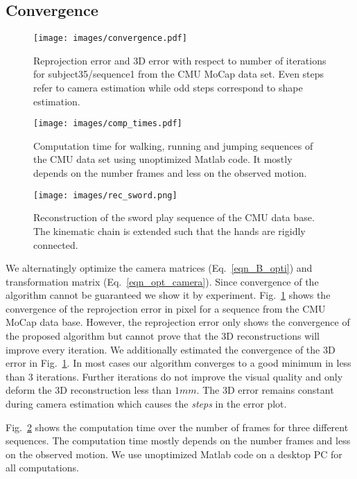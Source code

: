 \documentclass[10pt,letterpaper]{article}
\begin{document}
\subsection{Convergence}
\begin{figure}[t]
	\begin{center}
		\texttt{[image: images/convergence.pdf]}
	\end{center}
	\caption{Reprojection error and 3D error with respect to number of iterations for subject35/sequence1 from the CMU MoCap data set. Even steps refer to camera estimation while odd steps correspond to shape estimation.}
	\label{fig_convergence}
\end{figure}
\begin{figure}[t]
	\begin{center}
		\texttt{[image: images/comp\_times.pdf]}
	\end{center}
	\caption{Computation time for walking, running and jumping sequences of the CMU data set using unoptimized Matlab code. It mostly depends on the number frames and less on the observed motion.}
	\label{fig_comp_time}
\end{figure}
\begin{figure*}[t]
	\begin{center}
		\texttt{[image: images/rec\_sword.png]}
	\end{center}
	\caption{Reconstruction of the sword play sequence of the CMU data base. The kinematic chain is extended such that the hands are rigidly connected.}
	\label{fig_sword}
\end{figure*}
We alternatingly optimize the camera matrices (Eq.~\eqref{eqn_B_opti}) and transformation matrix (Eq.~\eqref{eqn_opt_camera}). Since convergence of the algorithm cannot be guaranteed we show it by experiment. Fig.~\ref{fig_convergence} shows the convergence of the reprojection error in pixel for a sequence from the CMU MoCap data base. However, the reprojection error only shows the convergence of the proposed algorithm but cannot prove that the 3D reconstructions will improve every iteration. We additionally estimated the convergence of the 3D error in Fig.~\ref{fig_convergence}. In most cases our algorithm converges to a good minimum in less than $3$ iterations. Further iterations do not improve the visual quality and only deform the 3D reconstruction less than $1mm$. The 3D error remains constant during camera estimation which causes the \textit{steps} in the error plot.

Fig.~\ref{fig_comp_time} shows the computation time over the number of frames for three different sequences. The computation time mostly depends on the number frames and less on the observed motion. We use unoptimized Matlab code on a desktop PC for all computations. 
\end{document}
